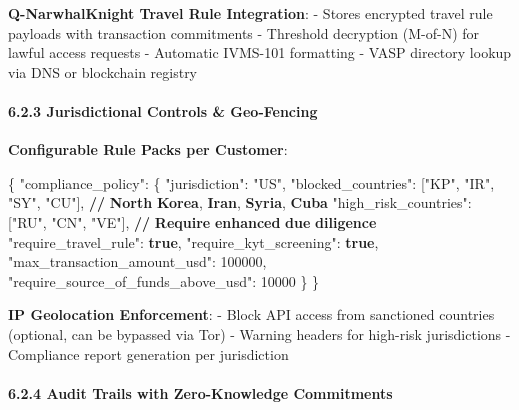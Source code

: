 \documentclass[
  11pt,
]{article}
\newenvironment{Shaded}{\begin{snugshade}}{\end{snugshade}}
\newcommand{\DataTypeTok}[1]{\textcolor[rgb]{0.13,0.29,0.53}{#1}}
\newcommand{\DecValTok}[1]{\textcolor[rgb]{0.00,0.00,0.81}{#1}}
\newcommand{\ErrorTok}[1]{\textcolor[rgb]{0.64,0.00,0.00}{\textbf{#1}}}
\newcommand{\FunctionTok}[1]{\textcolor[rgb]{0.00,0.00,0.00}{#1}}
\newcommand{\KeywordTok}[1]{\textcolor[rgb]{0.13,0.29,0.53}{\textbf{#1}}}
\newcommand{\OtherTok}[1]{\textcolor[rgb]{0.56,0.35,0.01}{#1}}
\newcommand{\StringTok}[1]{\textcolor[rgb]{0.31,0.60,0.02}{#1}}
\begin{document}
\textbf{Q-NarwhalKnight Travel Rule Integration}: - Stores encrypted
travel rule payloads with transaction commitments - Threshold decryption
(M-of-N) for lawful access requests - Automatic IVMS-101 formatting -
VASP directory lookup via DNS or blockchain registry

\hypertarget{jurisdictional-controls-geo-fencing}{%
\paragraph{6.2.3 Jurisdictional Controls \&
Geo-Fencing}\label{jurisdictional-controls-geo-fencing}}

\textbf{Configurable Rule Packs per Customer}:

\begin{Shaded}
\begin{Highlighting}[]
\FunctionTok{\{}
  \DataTypeTok{"compliance\_policy"}\FunctionTok{:} \FunctionTok{\{}
    \DataTypeTok{"jurisdiction"}\FunctionTok{:} \StringTok{"US"}\FunctionTok{,}
    \DataTypeTok{"blocked\_countries"}\FunctionTok{:} \OtherTok{[}\StringTok{"KP"}\OtherTok{,} \StringTok{"IR"}\OtherTok{,} \StringTok{"SY"}\OtherTok{,} \StringTok{"CU"}\OtherTok{]}\FunctionTok{,}  \ErrorTok{//} \ErrorTok{North} \ErrorTok{Korea}\FunctionTok{,} \ErrorTok{Iran}\FunctionTok{,} \ErrorTok{Syria}\FunctionTok{,} \ErrorTok{Cuba}
    \DataTypeTok{"high\_risk\_countries"}\FunctionTok{:} \OtherTok{[}\StringTok{"RU"}\OtherTok{,} \StringTok{"CN"}\OtherTok{,} \StringTok{"VE"}\OtherTok{]}\FunctionTok{,}  \ErrorTok{//} \ErrorTok{Require} \ErrorTok{enhanced} \ErrorTok{due} \ErrorTok{diligence}
    \DataTypeTok{"require\_travel\_rule"}\FunctionTok{:} \KeywordTok{true}\FunctionTok{,}
    \DataTypeTok{"require\_kyt\_screening"}\FunctionTok{:} \KeywordTok{true}\FunctionTok{,}
    \DataTypeTok{"max\_transaction\_amount\_usd"}\FunctionTok{:} \DecValTok{100000}\FunctionTok{,}
    \DataTypeTok{"require\_source\_of\_funds\_above\_usd"}\FunctionTok{:} \DecValTok{10000}
  \FunctionTok{\}}
\FunctionTok{\}}
\end{Highlighting}
\end{Shaded}

\textbf{IP Geolocation Enforcement}: - Block API access from sanctioned
countries (optional, can be bypassed via Tor) - Warning headers for
high-risk jurisdictions - Compliance report generation per jurisdiction

\hypertarget{audit-trails-with-zero-knowledge-commitments}{%
\paragraph{6.2.4 Audit Trails with Zero-Knowledge
Commitments}\label{audit-trails-with-zero-knowledge-commitments}}
\end{document}
